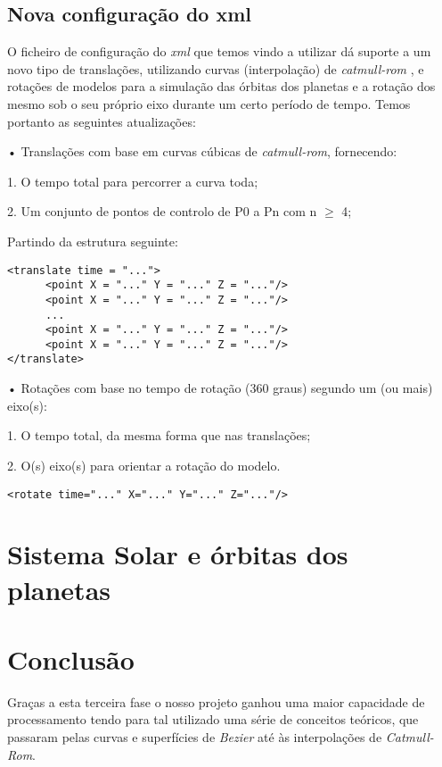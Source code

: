 \documentclass[11pt,a4paper]{report}
\begin{document}
\section{Nova configuração do xml}
O ficheiro de configuração do \emph{xml} que temos vindo a utilizar dá suporte a um novo tipo de translações, utilizando curvas (interpolação) de \emph{catmull-rom} , e rotações de modelos para a simulação das órbitas dos planetas e a rotação dos mesmo sob o seu próprio eixo durante um certo período de tempo.
Temos portanto as seguintes atualizações:

• Translações com base em curvas cúbicas de \emph{catmull-rom}, fornecendo:

1. O tempo total para percorrer a curva toda;

2. Um conjunto de pontos de controlo de P0 a Pn com n $\ge$ 4;

Partindo da estrutura seguinte:

\begin{lstlisting}[style = xml]
<translate time = "...">
      <point X = "..." Y = "..." Z = "..."/>
      <point X = "..." Y = "..." Z = "..."/>
      ...
      <point X = "..." Y = "..." Z = "..."/>
      <point X = "..." Y = "..." Z = "..."/>
</translate>
\end{lstlisting}

• Rotações com base no tempo de rotação (360 graus) segundo um (ou mais) eixo(s):

1. O tempo total, da mesma forma que nas translações;

2. O(s) eixo(s) para orientar a rotação do modelo.

\begin{lstlisting}[style = xml]
<rotate time="..." X="..." Y="..." Z="..."/>
\end{lstlisting}
\chapter{Sistema Solar e órbitas dos planetas}

\chapter{Conclusão}

Graças a esta terceira fase o nosso projeto ganhou uma maior capacidade de processamento tendo para tal utilizado uma série de conceitos teóricos, que passaram pelas  curvas e superfícies de \emph{Bezier} até às interpolações de \emph{Catmull-Rom}.
\end{document}
